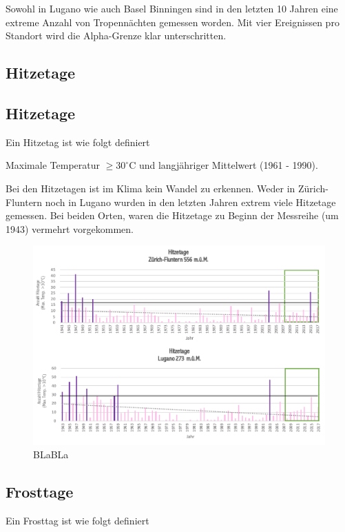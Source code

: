 \begin{refsection}
Sowohl in Lugano wie auch Basel Binningen sind in den letzten 10 Jahren eine extreme Anzahl von Tropennächten gemessen worden. Mit vier Ereignissen pro Standort wird die Alpha-Grenze klar unterschritten.


\subsection{Hitzetage} \label{Hitzetage}


\subsection{Hitzetage}
Ein Hitzetag ist wie folgt definiert

\begin{definition}
Maximale Temperatur $\ge 30^{\circ}$C und langjähriger Mittelwert (1961 - 1990).
\end{definition}


Bei den Hitzetagen ist im Klima kein Wandel zu erkennen. Weder in Zürich-Fluntern noch in Lugano wurden in den letzten Jahren extrem viele Hitzetage gemessen. Bei beiden Orten, waren die Hitzetage zu Beginn der Messreihe (um 1943) vermehrt vorgekommen.

\begin{figure}[htbp]
\centering
\includegraphics[width=1.0\textwidth]{extrem/Hitzetage.pdf}
\caption{BLaBLa}
\label{Hitzetage}
\end{figure}



\subsection{Frosttage}
Ein Frosttag ist wie folgt definiert


\end{refsection}
